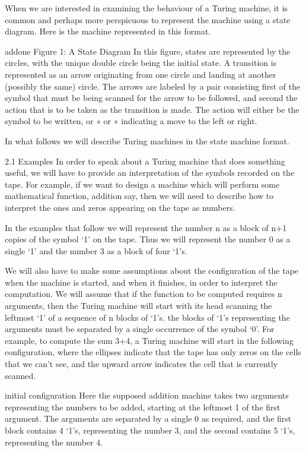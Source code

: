 When we are interested in examining the behaviour of a Turing machine, it is common and perhaps more perspicuous to represent the machine using a state diagram. Here is the machine represented in this format.

addone 
Figure 1: A State Diagram
In this figure, states are represented by the circles, with the unique double circle being the initial state. A transition is represented as an arrow originating from one circle and landing at another (possibly the same) circle. The arrows are labeled by a pair consisting first of the symbol that must be being scanned for the arrow to be followed, and second the action that is to be taken as the transition is made. The action will either be the symbol to be written, or « or » indicating a move to the left or right.

In what follows we will describe Turing machines in the state machine format.

2.1 Examples
In order to speak about a Turing machine that does something useful, we will have to provide an interpretation of the symbols recorded on the tape. For example, if we want to design a machine which will perform some mathematical function, addition say, then we will need to describe how to interpret the ones and zeros appearing on the tape as numbers.

In the examples that follow we will represent the number n as a block of n+1 copies of the symbol ‘1’ on the tape. Thus we will represent the number 0 as a single ‘1’ and the number 3 as a block of four ‘1’s.

We will also have to make some assumptions about the configuration of the tape when the machine is started, and when it finishes, in order to interpret the computation. We will assume that if the function to be computed requires n arguments, then the Turing machine will start with its head scanning the leftmost ‘1’ of a sequence of n blocks of ‘1’s. the blocks of ‘1’s representing the arguments must be separated by a single occurrence of the symbol ‘0’. For example, to compute the sum 3+4, a Turing machine will start in the following configuration, where the ellipses indicate that the tape has only zeros on the cells that we can't see, and the upward arrow indicates the cell that is currently scanned.

initial configuration
Here the supposed addition machine takes two arguments representing the numbers to be added, starting at the leftmost 1 of the first argument. The arguments are separated by a single 0 as required, and the first block contains 4 ‘1’s, representing the number 3, and the second contains 5 ‘1’s, representing the number 4.


